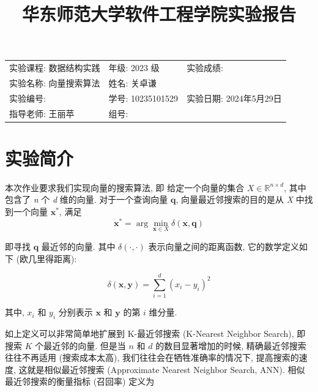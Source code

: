 \documentclass[11pt, UTF8]{article}
\title{华东师范大学软件工程学院实验报告}
\author{}
\date{}
\begin{document}
    \maketitle{}

    \begin{table} [H]
        \centering
        \label{tab:information-table}
        \begin{tabular}{@{}p{}p{}p{}@{}}
            \hline
            实验课程: 数据结构实践 & 年级: 2023 级      & 实验成绩:            \\
            实验名称: 向量搜索算法 & 姓名: 关卓谦         &                  \\
            实验编号:        & 学号: 10235101529 & 实验日期: 2024年5月29日 \\
            指导老师: 王丽苹    & 组号:             &                  \\
            \hline
        \end{tabular}
    \end{table}

    \tableofcontents


    \section{实验简介}\label{sec:lab-intro}
    本次作业要求我们实现向量的搜索算法, 即
    给定一个向量的集合 $X \in \mathbb{R}^{n \times d}$, 其中包含了 \textit{n} 个 \textit{d} 维的向量.
    对于一个查询向量 $\mathbf{q}$, 向量最近邻搜索的目的是从 \textit{X} 中找到一个向量 $\mathbf{x}^*$, 满足
    \[ \mathbf{x}^* = \arg\min_{\mathbf{x} \in X} \delta(\mathbf{x}, \mathbf{q}) \]

    即寻找 \(\mathbf{q}\) 最近邻的向量.
    其中 \(\delta(\cdot, \cdot)\) 表示向量之间的距离函数, 它的数学定义如下 (欧几里得距离):

    \[
        \delta(\mathbf{x}, \mathbf{y}) = \sum_{i=1}^{d} (x_i - y_i)^2
    \]

    其中, \(x_i\) 和 \(y_i\) 分别表示 \(\mathbf{x}\) 和 \(\mathbf{y}\) 的第 \(i\) 维分量.

    如上定义可以非常简单地扩展到 K-最近邻搜索 (K-Nearest Neighbor Search), 即搜索 \(K\) 个最近邻的向量.
    但是当 \(n\) 和 \(d\) 的数目显著增加的时候, 精确最近邻搜索往往不再适用 (搜索成本太高), 我们往往会在牺牲准确率的情况下,
    提高搜索的速度, 这就是相似最近邻搜索 (Approximate Nearest Neighbor Search, ANN).
    相似最近邻搜索的衡量指标 (召回率) 定义为
\end{document}
